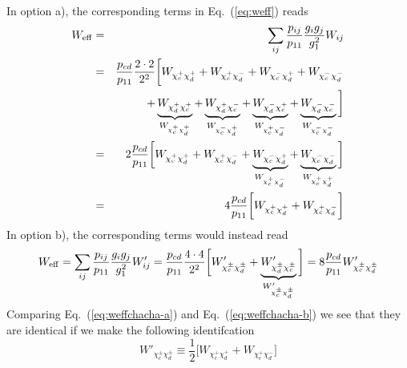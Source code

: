 \documentclass[a4paper,10pt,oneside]{book}
\begin{document}
In option a), the corresponding terms in Eq.~(\ref{eq:weff}) reads
\begin{eqnarray}
    W_{\rm eff} & = & \sum_{ij}\frac{p_{ij}}{p_{11}} 
    \frac{g_{i}g_{j}}{g_{1}^2} W_{ij} \nonumber \\
    & = &
    \frac{p_{cd}}{p_{11}} \frac{2 \cdot 2}{2^2}
    \bigg[ 
    W_{\chi_{c}^+ \chi_{d}^+} +
    W_{\chi_{c}^+ \chi_{d}^-} +
    W_{\chi_{c}^- \chi_{d}^+} +
    W_{\chi_{c}^- \chi_{d}^-} \nonumber \\
    & & +
    \underbrace{W_{\chi_{d}^+ \chi_{c}^+}}_{W_{\chi_{c}^+ \chi_{d}^+}} +
    \underbrace{W_{\chi_{d}^+ \chi_{c}^-}}_{W_{\chi_{c}^- \chi_{d}^+}} +
    \underbrace{W_{\chi_{d}^- \chi_{c}^+}}_{W_{\chi_{c}^+ \chi_{d}^-}} +
    \underbrace{W_{\chi_{d}^- \chi_{c}^-}}_{W_{\chi_{c}^- \chi_{d}^-}}
    \bigg] \nonumber \\
    & = & 
    2 \frac{p_{cd}}{p_{11}}
    \bigg[
    W_{\chi_{c}^+ \chi_{d}^+} +
    W_{\chi_{c}^+ \chi_{d}^-} +
    \underbrace{W_{\chi_{c}^- \chi_{d}^+}}_{W_{\chi_{c}^+ \chi_{d}^-}} +
    \underbrace{W_{\chi_{c}^- \chi_{d}^-}}_{W_{\chi_{c}^+ \chi_{d}^+}}
    \bigg] \nonumber \\
    & = & 
    4 \frac{p_{cd}}{p_{11}}
    \bigg[
    W_{\chi_{c}^+ \chi_{d}^+} +
    W_{\chi_{c}^+ \chi_{d}^-}
    \bigg]
    \label{eq:weffchacha-a}
\end{eqnarray}
In option b), the corresponding terms would instead read
\begin{equation}
    W_{\rm eff} = \sum_{ij}\frac{p_{ij}}{p_{11}} 
    \frac{g_{i}g_{j}}{g_{1}^2} W'_{ij} =
    \frac{p_{cd}}{p_{11}} \frac{4 \cdot 4}{2^2}
    \bigg[ 
    W'_{\chi_{c}^\pm \chi_{d}^\pm} +
    \underbrace{W'_{\chi_{d}^\pm \chi_{c}^\pm}}_{W'_{\chi_{c}^\pm \chi_{d}^\pm}}
    \bigg]
     = 8 \frac{p_{cd}}{p_{11}} W'_{\chi_{c}^\pm \chi_{d}^\pm}
    \label{eq:weffchacha-b}
\end{equation}
Comparing Eq.~(\ref{eq:weffchacha-a}) and Eq.~(\ref{eq:weffchacha-b}) 
we see that they are identical if we make the following identifcation
\begin{equation}
    W'_{\chi_{c}^\pm \chi_{d}^\pm} \equiv \frac{1}{2} 
        \bigg[
    W_{\chi_{c}^+ \chi_{d}^+} +
    W_{\chi_{c}^+ \chi_{d}^-}
    \bigg]
\end{equation} 
\end{document}
